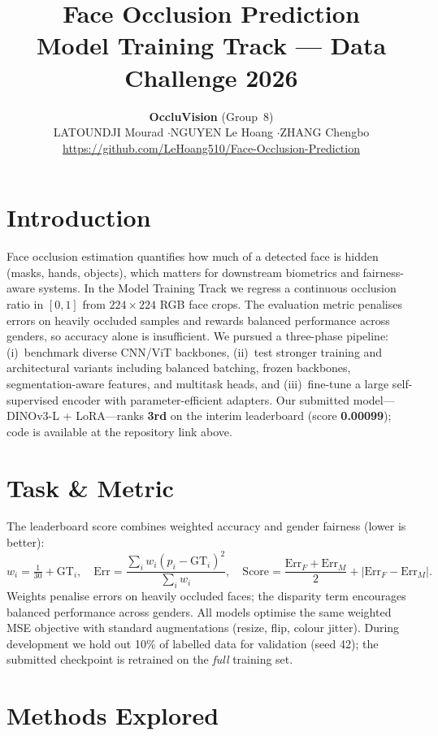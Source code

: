 \documentclass[10pt,a4paper]{article}
\title{\vspace{-1.2em}\textbf{Face Occlusion Prediction}\\[0.3em]
\large Model Training Track --- Data Challenge 2026}
\author{\textbf{OccluVision} \quad (Group~8)\\[0.3em]
LATOUNDJI Mourad \quad$\cdot$\quad NGUYEN Le Hoang \quad$\cdot$\quad ZHANG Chengbo\\[0.3em]
\url{https://github.com/LeHoang510/Face-Occlusion-Prediction}}
\date{}
\begin{document}
\maketitle
\vspace{-1.8em}

\section*{Introduction}
Face occlusion estimation quantifies how much of a detected face is hidden (masks, hands, objects), which matters for downstream biometrics and fairness-aware systems.
In the Model Training Track we regress a continuous occlusion ratio in $[0,1]$ from $224{\times}224$ RGB face crops.
The evaluation metric penalises errors on heavily occluded samples and rewards balanced performance across genders, so accuracy alone is insufficient.
We pursued a three-phase pipeline: (i)~benchmark diverse CNN/ViT backbones, (ii)~test stronger training and architectural variants including balanced batching, frozen backbones, segmentation-aware features, and multitask heads, and (iii)~fine-tune a large self-supervised encoder with parameter-efficient adapters.
Our submitted model---DINOv3-L + LoRA---ranks \textbf{3rd} on the interim leaderboard (score \textbf{0.00099}); code is available at the repository link above.

\section*{Task \& Metric}
The leaderboard score combines weighted accuracy and gender fairness (lower is better):
\begin{equation*}
  w_i = \tfrac{1}{30} + \mathrm{GT}_i, \quad
  \mathrm{Err} = \frac{\sum_i w_i(p_i - \mathrm{GT}_i)^2}{\sum_i w_i}, \quad
  \mathrm{Score} = \frac{\mathrm{Err}_F + \mathrm{Err}_M}{2} + \lvert \mathrm{Err}_F - \mathrm{Err}_M \rvert .
\end{equation*}
Weights penalise errors on heavily occluded faces; the disparity term encourages balanced performance across genders.
All models optimise the same weighted MSE objective with standard augmentations (resize, flip, colour jitter).
During development we hold out 10\% of labelled data for validation (seed 42); the submitted checkpoint is retrained on the \emph{full} training set.

\section*{Methods Explored}
\end{document}
